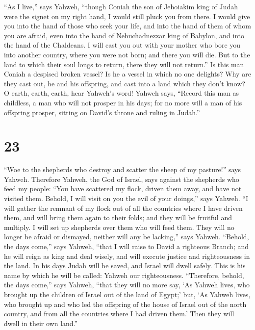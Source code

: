  ``As I live,'' says Yahweh, ``though Coniah the son of
Jehoiakim king of Judah were the signet on my right hand, I would still
pluck you from there.  I would give you into the hand of
those who seek your life, and into the hand of them of whom you are
afraid, even into the hand of Nebuchadnezzar king of Babylon, and into
the hand of the Chaldeans.  I will cast you out with your
mother who bore you into another country, where you were not born; and
there you will die.  But to the land to which their soul
longs to return, there they will not return.''  Is this man
Coniah a despised broken vessel? Is he a vessel in which no one
delights? Why are they cast out, he and his offspring, and cast into a
land which they don't know?  O earth, earth, earth, hear
Yahweh's word!  Yahweh says, ``Record this man as
childless, a man who will not prosper in his days; for no more will a
man of his offspring prosper, sitting on David's throne and ruling in
Judah.''

\hypertarget{section-22}{%
\section{23}\label{section-22}}

 ``Woe to the shepherds who destroy and scatter the sheep of
my pasture!'' says Yahweh.  Therefore Yahweh, the God of
Israel, says against the shepherds who feed my people: ``You have
scattered my flock, driven them away, and have not visited them. Behold,
I will visit on you the evil of your doings,'' says Yahweh. 
``I will gather the remnant of my flock out of all the countries where I
have driven them, and will bring them again to their folds; and they
will be fruitful and multiply.  I will set up shepherds over
them who will feed them. They will no longer be afraid or dismayed,
neither will any be lacking,'' says Yahweh.  ``Behold, the
days come,'' says Yahweh, ``that I will raise to David a righteous
Branch; and he will reign as king and deal wisely, and will execute
justice and righteousness in the land.  In his days Judah
will be saved, and Israel will dwell safely. This is his name by which
he will be called: Yahweh our righteousness.  ``Therefore,
behold, the days come,'' says Yahweh, ``that they will no more say, `As
Yahweh lives, who brought up the children of Israel out of the land of
Egypt;'  but, `As Yahweh lives, who brought up and who led
the offspring of the house of Israel out of the north country, and from
all the countries where I had driven them.' Then they will dwell in
their own land.''

